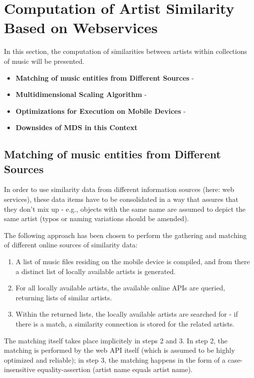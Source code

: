 \section{Computation of Artist Similarity Based on Webservices}
\label{sec:computation}

In this section, the computation of similarities between artists within collections of music
will be presented.

\begin{itemize}
	\item \textbf {Matching of music entities from Different Sources} - 
	\item \textbf {Multidimensional Scaling Algorithm} - 
	\item \textbf {Optimizations for Execution on Mobile Devices} - 
	\item \textbf {Downsides of MDS in this Context}
\end{itemize}

\subsection{Matching of music entities from Different Sources}

In order to use similarity data from different information sources (here: web services), these
data items have to be consolidated in a way that assures that they don't mix up - e.g., objects with
the same name are assumed to depict the same artist (typos or naming variations should be amended).

The following approach has been chosen to perform the gathering and matching of different online sources of 
similarity data:

\begin{enumerate}
	\item A list of music files residing on the mobile device is compiled, and from there a distinct list of 
locally available artists is generated.
	\item For all locally available artists, the available online APIs are queried, returning lists of similar artists.
	\item Within the returned lists, the locally available artists are searched for - if there is a match, a
similarity connection is stored for the related artists.
\end{enumerate}

The matching itself takes place implicitely in steps 2 and 3. In step 2, the matching is performed by the web API
itself (which is assumed to be highly optimized and reliable); in step 3, the matching happens in the form of a
case-insensitive equality-assertion (artist name equals artist name). 

